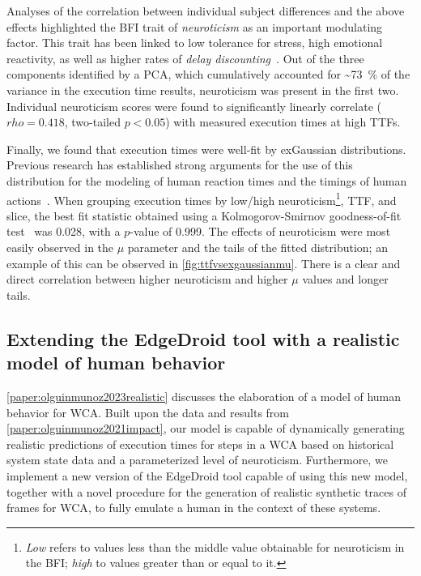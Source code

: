 Analyses of the correlation between individual subject differences and the above effects highlighted the \gls{BFI} trait of \emph{neuroticism} as an important modulating factor.
This trait has been linked to low tolerance for stress, high emotional reactivity, as well as higher rates of \emph{delay discounting}~\cite{hirsh2008delay}.
Out of the three components identified by a \gls{PCA}, which cumulatively accounted for \textasciitilde\SI{73}{\percent} of the variance in the execution time results, neuroticism was present in the first two.
Individual neuroticism scores were found to significantly linearly correlate (\ensuremath{rho = 0.418}, two-tailed \ensuremath{p < 0.05}) with measured execution times at high \glspl{TTF}.

Finally, we found that execution times were well-fit by \gls{exGaussian} distributions.
Previous research has established strong arguments for the use of this distribution for the modeling of human reaction times and the timings of human actions~\cite{rohrer1994analysis,palmer2011what,marmolejo_ramos2022generalised}.
When grouping execution times by low/high neuroticism\footnote{%
    \emph{Low} refers to values less than the middle value obtainable for neuroticism in the \gls{BFI}; \emph{high} to values greater than or equal to it.
}, \gls{TTF}, and slice, the best fit statistic obtained using a Kolmogorov-Smirnov goodness-of-fit test~\cite{massey_jr1951kolmogorov} was \num{0.028}, with a \ensuremath{p}-value of \num{0.999}.
The effects of neuroticism were most easily observed in the \ensuremath{\mu} parameter and the tails of the fitted distribution;
an example of this can be observed in \cref{fig:ttfvsexgaussianmu}.
There is a clear and direct correlation between higher neuroticism and higher \ensuremath{\mu} values and longer tails.

\subsection{Extending the EdgeDroid tool with a realistic model of human behavior}

\cref{paper:olguinmunoz2023realistic} discusses the elaboration of a model of human behavior for \gls{WCA}.
Built upon the data and results from \cref{paper:olguinmunoz2021impact}, our model is capable of dynamically generating realistic predictions of execution times for steps in a \gls{WCA} based on historical system state data and a parameterized level of neuroticism.
Furthermore, we implement a new version of the EdgeDroid tool capable of using this new model, together with a novel procedure for the generation of realistic synthetic traces of frames for \gls{WCA}, to fully emulate a human in the context of these systems.

